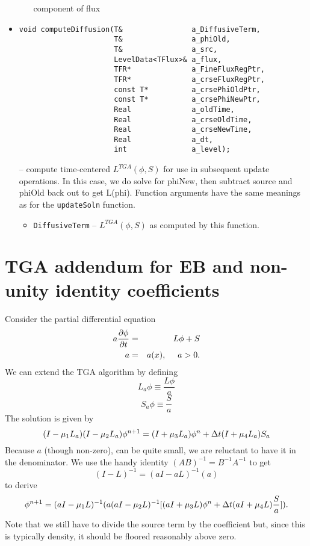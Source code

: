 \begin{itemize}
\begin{itemize}
  component of flux
\end{itemize}
\item
\begin{verbatim}
void computeDiffusion(T&                a_DiffusiveTerm,
                      T&                a_phiOld,
                      T&                a_src,
                      LevelData<TFlux>& a_flux,
                      TFR*              a_FineFluxRegPtr,
                      TFR*              a_crseFluxRegPtr,
                      const T*          a_crsePhiOldPtr,
                      const T*          a_crsePhiNewPtr,
                      Real              a_oldTime,
                      Real              a_crseOldTime,
                      Real              a_crseNewTime,
                      Real              a_dt,
                      int               a_level);

\end{verbatim}
-- compute time-centered $L^{TGA}(\phi,S)$ for use in subsequent update
operations.  In this case, we do solve for phiNew, then subtract
source and phiOld back out to get L(phi). Function arguments have the
same meanings as for the {\tt updateSoln} function.
\begin{itemize}
\item {\tt DiffusiveTerm} -- $L^{TGA}(\phi, S)$ as computed by this function.
\end{itemize}

\end{itemize}


\section{TGA addendum for EB and non-unity identity coefficients}

Consider the partial differential equation
\begin{eqnarray}
a \frac{\partial \phi}{\partial t} &=& L \phi + S \label{eqn:nonUnityParabolicEqn} \\
a &=& a(x), ~~~~ a > 0. \notag
\end{eqnarray}
We can extend the TGA algorithm by defining 
$$
L_a \phi \equiv \frac{L \phi}{a}
$$
$$
S_a \phi \equiv \frac{S}{a}
$$
The solution is given by
$$
(I-\mu_1 L_a)(I-\mu_2 L_a)\phi^{n+1}=(I+\mu_3 L_a) \phi^n + \Delta t (I+\mu_4 L_a)S_a
$$
Because $a$ (though non-zero), can be quite small, we are reluctant to
have it in the denominator.    We use the handy identity $(AB)^{-1} =
B^{-1}A^{-1}$ to get
\begin{equation}
(I - L)^{-1} = (a I - a L)^{-1} (a) \label{eqn:aLIdentity}
\end{equation}
to derive
\begin{equation}
\phi^{n+1}=(a I - \mu_1 L)^{-1}( a      (a I - \mu_2 L)^{-1}
         [ (a I + \mu_3 L) \phi^n + \Delta t (a I + \mu_4 L)\frac{S}{a}]).
  \label{eqn:nonUnityTGAUpdate}
\end{equation}
Note that we still have to divide the source term by the coefficient
but, since this is typically density, it should be floored reasonably
above zero.

